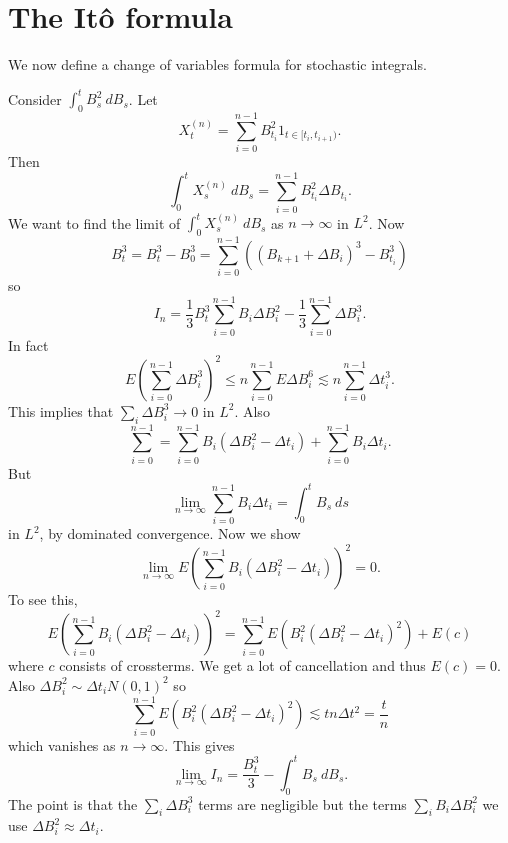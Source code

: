 \documentclass[12pt]{book}
\theoremstyle{definition}
\newenvironment{example}
  {\pushQED{\qed}\renewcommand{\qedsymbol}{$\diamondsuit$}\examplex}
  {\popQED\endexamplex}
\begin{document}
\section{The It\^o formula}
We now define a change of variables formula for stochastic integrals.

\begin{example}
Consider $\int_0^t B_s^2 ~dB_s$. Let
$$X_t^{(n)} = \sum_{i=0}^{n-1} B_{t_i}^2 1_{t \in [t_i, t_{i+1})}.$$
Then
$$\int_0^t X_s^{(n)} ~dB_s = \sum_{i=0}^{n-1} B_{t_i}^2 \Delta B_{t_i}.$$
We want to find the limit of $\int_0^t X_s^{(n)} ~dB_s$ as $n \to \infty$ in $L^2$.
Now
$$B_t^3 = B_t^3 - B_0^3 = \sum_{i=0}^{n-1} ((B_{k+1} + \Delta B_i)^3 - B_{t_i}^3)$$
so
$$I_n = \frac{1}{3}B_t^3 \sum_{i=0}^{n-1} B_i\Delta B_i^2 - \frac{1}{3} \sum_{i=0}^{n-1} \Delta B_i^3.$$
In fact
$$E\left(\sum_{i=0}^{n-1} \Delta B_i^3\right)^2 \leq n \sum_{i=0}^{n-1} E\Delta B_i^6 \lesssim n \sum_{i=0}^{n-1} \Delta t_i^3.$$
This implies that $\sum_i \Delta B_i^3 \to 0$ in $L^2$.
Also
$$\sum_{i=0}^{n-1} = \sum_{i=0}^{n-1} B_i(\Delta B_i^2 - \Delta t_i) + \sum_{i=0}^{n-1} B_i \Delta t_i.$$
But
$$\lim_{n \to \infty} \sum_{i=0}^{n-1} B_i \Delta t_i = \int_0^t B_s ~ds$$
in $L^2$, by dominated convergence. Now we show
$$\lim_{n \to \infty} E\left(\sum_{i=0}^{n-1} B_i(\Delta B_i^2 - \Delta t_i)\right)^2 = 0.$$
To see this,
$$ E\left(\sum_{i=0}^{n-1} B_i(\Delta B_i^2 - \Delta t_i)\right)^2 = \sum_{i=0}^{n-1} E(B_i^2 (\Delta B_i^2 - \Delta t_i)^2) + E(c)$$
where $c$ consists of crossterms. We get a lot of cancellation and thus $E(c) = 0$.
Also $\Delta B_i^2 \sim \Delta t_i N(0, 1)^2$ so
$$\sum_{i=0}^{n-1} E(B_i^2 (\Delta B_i^2 - \Delta t_i)^2) \lesssim t n \Delta t^2 = \frac{t}{n}$$
which vanishes as $n \to \infty$. This gives
$$\lim_{n \to \infty} I_n = \frac{B_t^3}{3} - \int_0^t B_s ~dB_s.$$
The point is that the $\sum_i \Delta B_i^3$ terms are negligible but the terms $\sum_i B_i \Delta B_i^2$ we use $\Delta B_i^2 \approx \Delta t_i$.
\end{example}
\end{document}
